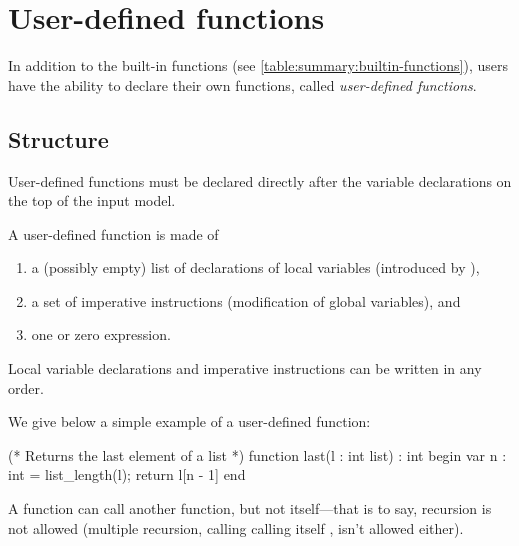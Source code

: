 \section{User-defined functions}\label{section:user_defined_functions}

In addition to the built-in functions (see \cref{table:summary:builtin-functions}), users have the ability to declare their own functions, called \emph{user-defined functions}.

\subsection{Structure}

User-defined functions must be declared directly after the variable declarations on the top of the input model.

A user-defined function is made of
\begin{enumerate}
	\item a (possibly empty) list of declarations of local variables (introduced by ),
	\item a set of imperative instructions (modification of global variables), and
	\item one or zero  expression.
\end{enumerate}

Local variable declarations and imperative instructions can be written in any order.

\begin{example}
We give below a simple example of a user-defined function:

\begin{IMITATORmodel}
(* Returns the last element of a list *)
function last(l : int list) : int
begin
	var n : int = list_length(l);
	return l[n - 1]
end
\end{IMITATORmodel}
\end{example}


A function can call another function, but not itself---that is to say, recursion is not allowed (multiple recursion, \ie{}  calling  calling itself , isn't allowed either).


